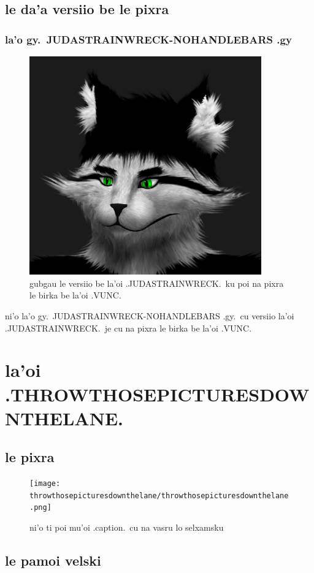 \documentclass{report}
\begin{document}
\section{le da'a versiio be le pixra}

\subsection{la'o gy.\ JUDASTRAINWRECK-NOHANDLEBARS .gy}
\begin{figure}[ht]
	\centering
	\includegraphics[width=10cm]{judastrainwreck/judastrainwreck-nohandlebars.png}
	\caption[center]{gubgau le versiio be la'oi .JUDASTRAINWRECK.\ ku poi na pixra le birka be la'oi .VUNC.}
\end{figure}
ni'o la'o gy.\ JUDASTRAINWRECK-NOHANDLEBARS .gy.\ cu versiio la'oi .JUDASTRAINWRECK.\ je cu na pixra le birka be la'oi .VUNC.

\chapter{la'oi .THROWTHOSEPICTURESDOWNTHELANE.}
\section{le pixra}
\begin{figure}[ht]
	\centering
	\texttt{[image: throwthosepicturesdownthelane/throwthosepicturesdownthelane.png]}
	\caption[center]{ni'o ti poi mu'oi .caption.\ cu na vasru lo selxamsku}
\end{figure}
\section{le pamoi velski}
\end{document}
